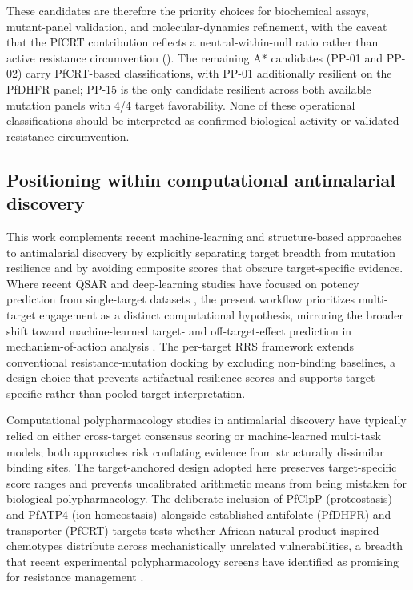\documentclass[journal=jcisd8,manuscript=article]{achemso}
\begin{document}
These candidates are therefore the priority choices for biochemical assays, mutant-panel validation, and molecular-dynamics refinement, with the caveat that the PfCRT contribution reflects a neutral-within-null ratio rather than active resistance circumvention (). The remaining A* candidates (PP-01 and PP-02) carry PfCRT-based classifications, with PP-01 additionally resilient on the PfDHFR panel; PP-15 is the only candidate resilient across both available mutation panels with \num{4}/\num{4} target favorability. None of these operational classifications should be interpreted as confirmed biological activity or validated resistance circumvention.

\subsection{Positioning within computational antimalarial discovery}\label{sec:disc_positioning}
This work complements recent machine-learning and structure-based approaches to antimalarial discovery by explicitly separating target breadth from mutation resilience and by avoiding composite scores that obscure target-specific evidence. Where recent QSAR and deep-learning studies have focused on potency prediction from single-target datasets \cite{Wells2015,SiqueiraNeto2023,Sentinel2025Offtarget}, the present workflow prioritizes multi-target engagement as a distinct computational hypothesis, mirroring the broader shift toward machine-learned target- and off-target-effect prediction in mechanism-of-action analysis \cite{Trapotsi2022MoA}. The per-target RRS framework extends conventional resistance-mutation docking by excluding non-binding baselines, a design choice that prevents artifactual resilience scores and supports target-specific rather than pooled-target interpretation.

Computational polypharmacology studies in antimalarial discovery have typically relied on either cross-target consensus scoring or machine-learned multi-task models; both approaches risk conflating evidence from structurally dissimilar binding sites. The target-anchored design adopted here preserves target-specific score ranges and prevents uncalibrated arithmetic means from being mistaken for biological polypharmacology. The deliberate inclusion of PfClpP (proteostasis) and PfATP4 (ion homeostasis) alongside established antifolate (PfDHFR) and transporter (PfCRT) targets tests whether African-natural-product-inspired chemotypes distribute across mechanistically unrelated vulnerabilities, a breadth that recent experimental polypharmacology screens have identified as promising for resistance management \cite{Wells2015,SiqueiraNeto2023,Blake2025Resistome}.
\end{document}
